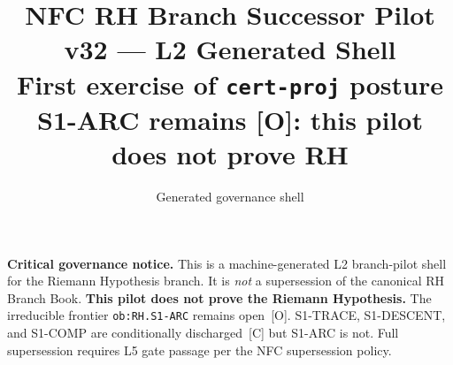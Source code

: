 \documentclass[11pt]{article}
\title{NFC RH Branch Successor Pilot\\[0.5ex]
  \large v32 --- L2 Generated Shell\\[0.5ex]
  \normalsize First exercise of \texttt{cert-proj} posture\\[0.5ex]
  \small S1-ARC remains [O]: this pilot does not prove RH}
\author{Generated governance shell}
\date{}
\begin{document}
\maketitle
\tableofcontents
\bigskip
\noindent\textbf{Critical governance notice.}
This is a machine-generated L2 branch-pilot shell for the Riemann Hypothesis branch.
It is \emph{not} a supersession of the canonical RH Branch Book.
\textbf{This pilot does not prove the Riemann Hypothesis.}
The irreducible frontier \texttt{ob:RH.S1-ARC} remains open~[O].
S1-TRACE, S1-DESCENT, and S1-COMP are conditionally discharged~[C]
but S1-ARC is not.
Full supersession requires L5 gate passage per the NFC supersession policy.
\vspace{1em}

\end{document}
